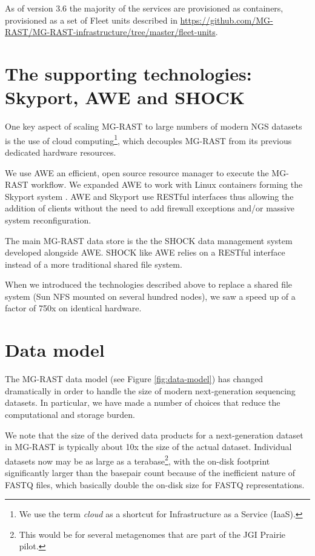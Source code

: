 \documentclass[12pt,fullpage]{report}
\begin{document}
As of version 3.6 the majority of the services are provisioned as containers, provisioned as a set of Fleet units described in \url{https://github.com/MG-RAST/MG-RAST-infrastructure/tree/master/fleet-units}.


\section{The supporting technologies: Skyport, AWE and SHOCK}

One key aspect of scaling MG-RAST to large numbers of modern NGS datasets is the use of cloud computing\footnote{We use the term \textit{cloud} as a shortcut for Infrastructure as a Service (IaaS).}, which decouples MG-RAST from its previous dedicated hardware resources.

We use AWE \cite{AWE} an efficient, open source resource manager to execute the MG-RAST workflow. We expanded AWE to work with Linux containers forming the Skyport system \cite{SKYPORT}. AWE and Skyport use RESTful interfaces thus allowing the addition of clients without the need to add firewall exceptions and/or massive system reconfiguration.

The main MG-RAST data store is the the SHOCK data management system \cite{SHOCK} developed alongside AWE. SHOCK like AWE relies on a RESTful interface instead of a more traditional shared file system.

When we introduced the technologies described above to replace a shared file system (Sun NFS mounted on several hundred nodes), we saw a speed up of a factor of 750x on identical hardware.


\section{Data model}

The MG-RAST data model (see Figure \ref{fig:data-model}) has changed dramatically in order to handle the size of modern next-generation sequencing datasets. In particular, we have made a number of choices that reduce the computational and storage burden.

We note that the size of the derived data products for a next-generation dataset in MG-RAST is typically about 10x the size of the actual dataset. Individual datasets now may be as large as a terabase\footnote{This would be for several metagenomes that are part of the JGI Prairie pilot.}, with the on-disk footprint significantly larger than the basepair count because of the inefficient nature of FASTQ files, which  basically double the on-disk size for FASTQ representations.
\end{document}
